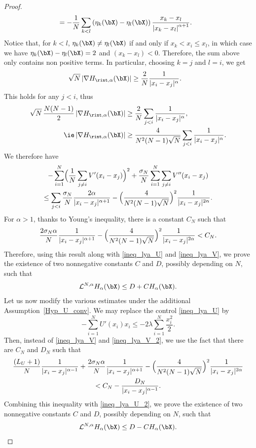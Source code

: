 \begin{proof}
\begin{align*}
&=-\frac{1}{N}\sum_{k<l}\left(\eta_k(\bX)-\eta_l(\bX)\right)\frac{x_k-x_l}{\left|x_k-x_l\right|^{\alpha+1}}.
\end{align*}
Notice that, for $k<l$, $\eta_k(\bX)\neq\eta_l(\bX)$ if and only if $x_k<x_i\leq x_l$, in which case we have $\eta_k(\bX)-\eta_l(\bX)=2$ and $\left(x_k-x_l\right)<0$. Therefore, the sum above only contains non positive terms. In particular, choosing $k=j$ and $l=i$, we get
\begin{align*}
\sqrt{N}\left|\nabla H_{\rint, \alpha}(\bX)\right|&\geq\frac{2}{N}\frac{1}{|x_i-x_j|^{\alpha}}.
\end{align*}
This holds for any $j<i$, thus
\begin{align*}
\sqrt{N}\,\frac{N(N-1)}{2}\left|\nabla H_{\rint, \alpha}(\bX)\right|&\geq\frac{2}{N}\sum_{j<i}\frac{1}{|x_i-x_j|^{\alpha}},\\\tag*{\ie}
\left|\nabla H_{\rint, \alpha}(\bX)\right|&\geq\frac{4}{N^2(N-1)\sqrt{N}}\sum_{j<i}\frac{1}{|x_i-x_j|^{\alpha}}.
\end{align*}
We therefore have
\begin{multline*}
-\sum_{i=1}^N\Bigl(\frac{1}{N}\sum_{j\neq i}V'(x_i-x_j)\Bigr)^2+\frac{\sigma_N}{N}\sum_{i=1}^N\sum_{j\neq i}V''(x_i-x_j)\\
\leq\sum_{j< i}\frac{\sigma_N}{N}\frac{2\alpha}{|x_i-x_j|^{\alpha+1}}-\Bigl(\frac{4}{N^2(N-1)\sqrt{N}}\Bigr)^2\frac{1}{|x_i-x_j|^{2\alpha}}.
\end{multline*}
For $\alpha>1$, thanks to Young's inequality, there is a constant $C_N$ such that
\[
\frac{2\sigma_N\alpha}{N}\frac{1}{|x_i-x_j|^{\alpha+1}}-\Bigl(\frac{4}{N^2(N-1)\sqrt{N}}\Bigr)^2\frac{1}{|x_i-x_j|^{2\alpha}}<C_N.
\]
Therefore, using this result along with \eqref{ineq_lya_U} and \eqref{ineq_lya_V}, we prove the existence of two nonnegative constants $C$ and $D$, possibly depending on $N$, such that
\[
\mathcal{L}^{N,\alpha} H_{\alpha}(\bX)\leq D+CH_{\alpha}(\bX).
\]
Let us now modify the various estimates under the additional Assumption~\ref{Hyp_U_conv}. We may replace the control \eqref{ineq_lya_U} by
\begin{equation}\label{ineq_lya_U_2}
-\sum_{i=1}^N U'(x_i)x_i\leq-2\lambda\sum_{i=1}^N\frac{x_i^2}{2}.
\end{equation}
Then, instead of \eqref{ineq_lya_V} and \eqref{ineq_lya_V_2}, we use the fact that there are $C_N$ and $D_N$ such that
\begin{multline*}
\frac{(L_U+1)}{N}\frac{1}{|x_i-x_j|^{\alpha-1}} +\frac{2\sigma_N\alpha}{N}\frac{1}{|x_i-x_j|^{\alpha+1}}-\Bigl(\frac{4}{N^2(N-1)\sqrt{N}}\Bigr)^2\frac{1}{|x_i-x_j|^{2\alpha}}\\
<C_N-\frac{D_N}{|x_i-x_j|^{\alpha-1}}.
\end{multline*}
Combining this inequality with \eqref{ineq_lya_U_2}, we prove the existence of two nonnegative constants $C$ and $D$, possibly depending on $N$, such that
\[
\mathcal{L}^{N,\alpha} H_{\alpha}(\bX)\leq D-CH_{\alpha}(\bX).\qedhere
\]
\end{proof}

